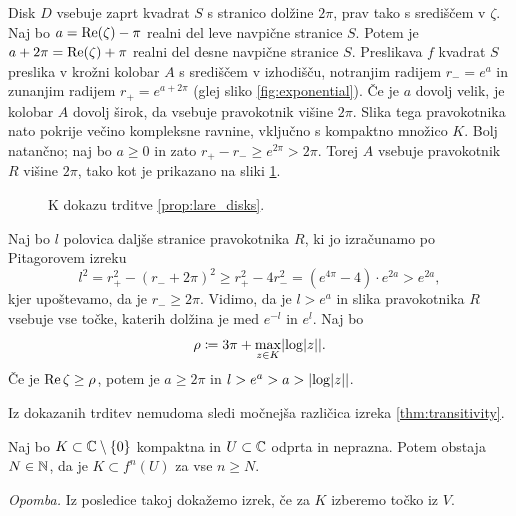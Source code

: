 \begin{dokaz}
    Disk \(D\) vsebuje zaprt kvadrat \(S\) s stranico dolžine \(2 \pi\), prav tako s središčem v \(\zeta\). Naj bo \(a = \operatorname{Re} (\zeta) - \pi\) realni del leve navpične stranice \(S\). Potem je \(a + 2 \pi = \operatorname{Re} (\zeta) + \pi\) realni del desne navpične stranice \(S\). Preslikava \(f\) kvadrat \(S\) preslika v krožni kolobar \(A\) s središčem v izhodišču, notranjim radijem \(r_{-} = e^a\) in zunanjim radijem \(r_{+} = e^{a + 2 \pi}\) (glej sliko \ref{fig:exponential}). Če je \(a\) dovolj velik, je kolobar \(A\) dovolj širok, da vsebuje pravokotnik višine \(2 \pi\). Slika tega pravokotnika nato pokrije večino kompleksne ravnine, vključno s kompaktno množico \(K\). Bolj natančno; naj bo \(a \geq 0\) in zato \(r_+ - r_- \geq e^{2 \pi} > 2 \pi\). Torej \(A\) vsebuje pravokotnik \(R\) višine \(2 \pi\), tako kot je prikazano na sliki \ref{fig:transitivity}.
    \begin{figure}%
        \centering
        
        \caption{K dokazu trditve \ref{prop:lare_disks}.}
        \label{fig:transitivity}
    \end{figure}
    Naj bo \(l\) polovica daljše stranice pravokotnika \(R\), ki jo izračunamo po Pitagorovem izreku
    \[l^2 = r_+^2 - (r_- + 2 \pi)^2 \geq r_+^2 - 4 r_-^2 = (e^{4 \pi} - 4) \cdot e^{2 a} > e^{2 a},\]
    kjer upoštevamo, da je \(r_- \geq 2 \pi\). Vidimo, da je \(l > e^a\) in slika pravokotnika \(R\) vsebuje vse točke, katerih dolžina je med \(e^{- l}\) in \(e^l\). Naj bo
    \[\rho \coloneq 3 \pi + \max_{z \in K} \abs{ \log \abs{z} }.\]
    Če je \(\operatorname{Re} \zeta \geq \rho\), potem je \(a \geq 2 \pi\) in \(l > e^a > a > \abs{\log \abs{z}}\).
\end{dokaz}

\noindent Iz dokazanih trditev nemudoma sledi močnejša različica izreka \ref{thm:transitivity}.

\begin{posledica}
    Naj bo \(K \subset \mathbb C \setminus \left\{ 0 \right\}\) kompaktna in \(U \subset \mathbb C\) odprta in neprazna. Potem obstaja \(N \in \mathbb N\), da je \(K \subset f^n (U)\) za vse \(n \geq N\).
\end{posledica}

\noindent \textit{Opomba.} Iz posledice takoj dokažemo izrek, če za \(K\) izberemo točko iz \(V\).

